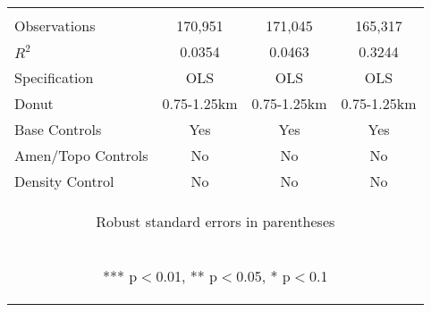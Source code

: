 \begin{tabular}{lccc}
\vspace{4pt} & \begin{footnotesize}\end{footnotesize} & \begin{footnotesize}\end{footnotesize} & \begin{footnotesize}\end{footnotesize} \\
Observations & 170,951 & 171,045 & 165,317 \\
$R^2$ & 0.0354 & 0.0463 & 0.3244 \\
Specification & OLS & OLS & OLS \\
Donut & 0.75-1.25km & 0.75-1.25km & 0.75-1.25km \\
Base Controls & Yes & Yes & Yes \\
Amen/Topo Controls & No & No & No \\
 Density Control & No & No & No \\ \hline
\multicolumn{4}{c}{\begin{footnotesize} Robust standard errors in parentheses\end{footnotesize}} \\
\multicolumn{4}{c}{\begin{footnotesize} *** p$<$0.01, ** p$<$0.05, * p$<$0.1\end{footnotesize}} \\
\end{tabular}


